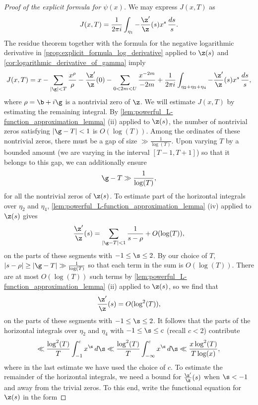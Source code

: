 \begin{proof}[Proof of the explicit formula for $\psi(x)$]
      We may express $J(x,T)$ as
      \[
        J(x,T) = \frac{1}{2\pi i}\int_{\eta_{1}}-\frac{\z'}{\z}(s)x^{s}\,\frac{ds}{s}.
      \]
      The residue theorem together with the formula for the negative logarithmic derivative in \cref{prop:explicit_formula_log_derivative} applied to $\z(s)$ and \cref{cor:logarithmic_derivative_of_gamma} imply
      \begin{equation}\label{equ:explicit_formula_zeta_proof_7}
        J(x,T) = x-\sum_{|\g| < T}\frac{x^{\rho}}{\rho}-\frac{\z'}{\z}(0)-\sum_{0 < 2m < U}\frac{x^{-2m}}{-2m}+\frac{1}{2\pi i}\int_{\eta_{2}+\eta_{3}+\eta_{4}}-\frac{\z'}{\z}(s)x^{s}\,\frac{ds}{s},
      \end{equation}
      where $\rho = \b+i\g$ is a nontrivial zero of $\z$. We will estimate $J(x,T)$ by estimating the remaining integral. By \cref{lem:powerful_L-function_approximation_lemma} (ii) applied to $\z(s)$, the number of nontrivial zeros satisfying $|\g-T| < 1$ is $O(\log(T))$. Among the ordinates of these nontrivial zeros, there must be a gap of size $\gg \frac{1}{\log(T)}$. Upon varying $T$ by a bounded amount (we are varying in the interval $[T-1,T+1]$) so that it belongs to this gap, we can additionally ensure
      \[
        \g-T \gg \frac{1}{\log(T)},
      \]
      for all the nontrivial zeros of $\z(s)$. To estimate part of the horizontal integrals over $\eta_{2}$ and $\eta_{4}$, \cref{lem:powerful_L-function_approximation_lemma} (iv) applied to $\z(s)$ gives
      \[
        \frac{\z'}{\z}(s) = \sum_{|\g-T| < 1}\frac{1}{s-\rho}+O(\log(T)),
      \]
      on the parts of these segments with $-1 \le \s \le 2$. By our choice of $T$, $|s-\rho| \ge |\g-T| \gg \frac{1}{\log(T)}$ so that each term in the sum is $O(\log(T))$. There are at most $O(\log(T))$ such terms by \cref{lem:powerful_L-function_approximation_lemma} (ii) applied to $\z(s)$, so we find that
      \[
        \frac{\z'}{\z}(s) = O(\log^{2}(T)),
      \]
      on the parts of these segments with $-1 \le \s \le 2$. It follows that the parts of the horizontal integrals over $\eta_{2}$ and $\eta_{4}$ with  $-1 \le \s \le c$ (recall $c < 2$) contribute
      \begin{equation}\label{equ:explicit_formula_zeta_proof_8}
        \ll \frac{\log^{2}(T)}{T}\int_{-1}^{c}x^{\s}\,d\s \ll \frac{\log^{2}(T)}{T}\int_{-\infty}^{c}x^{\s}\,d\s \ll \frac{x\log^{2}(T)}{T\log(x)},
      \end{equation}
      where in the last estimate we have used the choice of $c$. To estimate the remainder of the horizontal integrals, we need a bound for $\frac{\z'}{\z}(s)$ when $\s < -1$ and away from the trivial zeros. To this end, write the functional equation for $\z(s)$ in the form

\end{proof}
